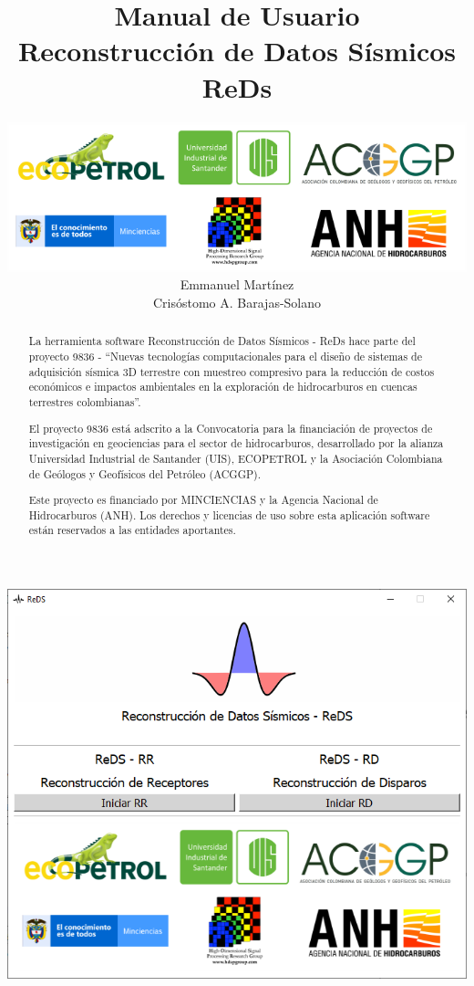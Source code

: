 \documentclass[12pt,twoside,letter]{ol-softwaremanual}
\title{\large{Manual de Usuario}\\ \vspace{10mm} \huge{Reconstrucción de Datos Sísmicos}\\ \vspace{5mm} \huge{ReDs}}
\author{\includegraphics[width=14cm]{figures/all_logos3.png} \\ Emmanuel Martínez \\ Crisóstomo A. Barajas-Solano}
\begin{document}
\maketitle

\newpage\null\thispagestyle{empty}\newpage

\begin{center}
\includegraphics[width=.65\linewidth]{launch.png}
\end{center}
\begin{abstract}
La herramienta software Reconstrucción de Datos Sísmicos - ReDs hace parte del proyecto 9836 - ``Nuevas tecnologías computacionales para el diseño de sistemas de adquisición sísmica 3D terrestre con muestreo compresivo para la reducción de costos económicos e impactos ambientales en la exploración de hidrocarburos en cuencas terrestres colombianas''.

El proyecto 9836 está adscrito a la Convocatoria para la financiación de proyectos de investigación en geociencias para el sector de hidrocarburos, desarrollado por la alianza Universidad Industrial de Santander (UIS), ECOPETROL y la Asociación Colombiana de Geólogos y Geofísicos del Petróleo (ACGGP). 

Este proyecto es financiado por MINCIENCIAS y la Agencia Nacional de Hidrocarburos (ANH). Los derechos y licencias de uso sobre esta aplicación software están reservados a las entidades aportantes.
\end{abstract}
\end{document}

